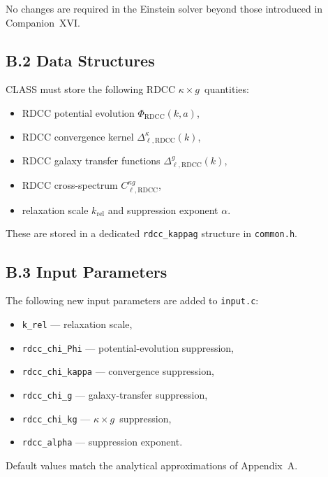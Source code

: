 \documentclass[11pt,a4paper]{article}
\newcommand{\kappag}{\texorpdfstring{$\kappa\times g$}{κ×g}}
\begin{document}
No changes are required in the Einstein solver beyond those introduced in Companion~XVI.

\subsection*{B.2 Data Structures}

CLASS must store the following RDCC \kappag\ quantities:

\begin{itemize}
    \item RDCC potential evolution $\Phi_{\mathrm{RDCC}}(k,a)$,
    \item RDCC convergence kernel $\Delta_{\ell,\mathrm{RDCC}}^{\kappa}(k)$,
    \item RDCC galaxy transfer functions $\Delta_{\ell,\mathrm{RDCC}}^{g}(k)$,
    \item RDCC cross-spectrum $C_{\ell,\mathrm{RDCC}}^{\kappa g}$,
    \item relaxation scale $k_{\mathrm{rel}}$ and suppression exponent $\alpha$.
\end{itemize}

These are stored in a dedicated \texttt{rdcc\_kappag} structure in \texttt{common.h}.

\subsection*{B.3 Input Parameters}

The following new input parameters are added to \texttt{input.c}:

\begin{itemize}
    \item \texttt{k\_rel} — relaxation scale,
    \item \texttt{rdcc\_chi\_Phi} — potential-evolution suppression,
    \item \texttt{rdcc\_chi\_kappa} — convergence suppression,
    \item \texttt{rdcc\_chi\_g} — galaxy-transfer suppression,
    \item \texttt{rdcc\_chi\_kg} — \kappag\ suppression,
    \item \texttt{rdcc\_alpha} — suppression exponent.
\end{itemize}

Default values match the analytical approximations of Appendix~A.
\end{document}

